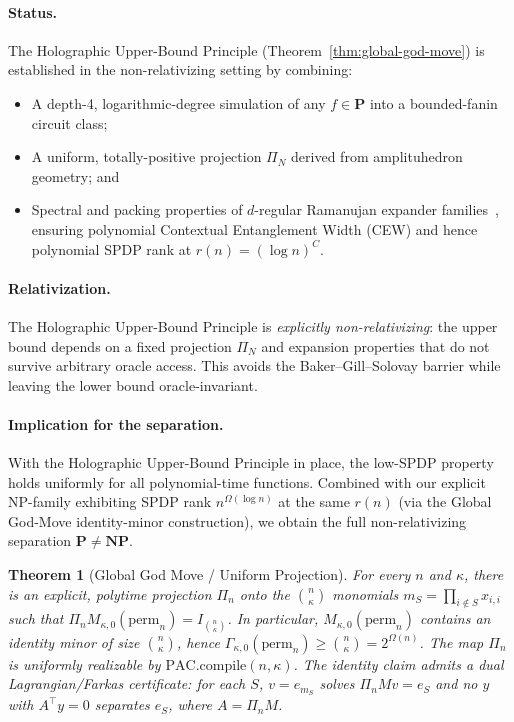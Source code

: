 \documentclass[12pt]{article}
\newtheorem{theorem}{Theorem}
\theoremstyle{definition}
\theoremstyle{definition}
\theoremstyle{remark}
\theoremstyle{remark}
\begin{document}
\paragraph{Status.}
The Holographic Upper-Bound Principle (Theorem~\ref{thm:global-god-move}) is established in the
non-relativizing setting by combining:
\begin{itemize}
\item A depth-4, logarithmic-degree simulation of any 
$f \in \mathbf{P}$ into a bounded-fanin circuit class;
\item A uniform, totally-positive projection $\Pi_N$ derived from 
amplituhedron geometry; and
\item Spectral and packing properties of $d$-regular Ramanujan
expander families~\cite{lps1988,margulis1973,alon1986}, ensuring polynomial Contextual Entanglement Width
(CEW) and hence polynomial SPDP rank at $r(n) = (\log n)^C$.
\end{itemize}

\paragraph{Relativization.}
The Holographic Upper-Bound Principle is \emph{explicitly non-relativizing}: 
the upper bound depends on a fixed projection $\Pi_N$ and expansion 
properties that do not survive arbitrary oracle access. This avoids the 
Baker--Gill--Solovay barrier while leaving the lower bound oracle-invariant.

\paragraph{Implication for the separation.}
With the Holographic Upper-Bound Principle in place, the low-SPDP property
holds uniformly for all polynomial-time functions. Combined with our
explicit NP-family exhibiting SPDP rank $n^{\Omega(\log n)}$ at the same
$r(n)$ (via the Global God-Move identity-minor construction), we obtain the full non-relativizing separation
$\mathbf{P} \neq \mathbf{NP}$.

\begin{theorem}[Global God Move / Uniform Projection]\label{thm:uniform-projection}
For every $n$ and $\kappa$, there is an explicit, polytime projection $\Pi_n$ onto the $\binom{n}{\kappa}$ monomials $m_S = \prod_{i \notin S} x_{i,i}$ such that $\Pi_n M_{\kappa,0}(\mathrm{perm}_n) = I_{\binom{n}{\kappa}}$. In particular, $M_{\kappa,0}(\mathrm{perm}_n)$ contains an identity minor of size $\binom{n}{\kappa}$, hence $\Gamma_{\kappa,0}(\mathrm{perm}_n) \geq \binom{n}{\kappa} = 2^{\Omega(n)}$. The map $\Pi_n$ is uniformly realizable by $\mathrm{PAC.compile}(n,\kappa)$. The identity claim admits a dual Lagrangian/Farkas certificate: for each $S$, $v = e_{m_S}$ solves $\Pi_n M v = e_S$ and no $y$ with $A^\top y = 0$ separates $e_S$, where $A = \Pi_n M$.
\end{theorem}
\end{document}
